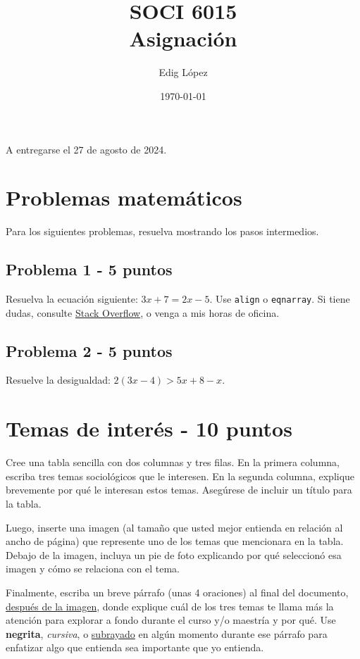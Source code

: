 \documentclass[11pt]{article} %
\title{SOCI 6015\\ Asignación \textnumero 1}
\author{Edig López}
\date{\today}
\begin{document}
\maketitle
\begin{center}
   A entregarse el 27 de agosto de 2024. 
\end{center}


\section{Problemas matemáticos}

Para los siguientes problemas, resuelva mostrando los pasos intermedios.

\subsection{Problema 1 - 5 puntos} 

Resuelva la ecuación siguiente: $3x + 7 = 2x - 5$. Use \texttt{align} o \texttt{eqnarray}. Si tiene dudas, consulte \href{https://tex.stackexchange.com}{Stack Overflow}, o venga a mis horas de oficina.

\subsection{Problema 2 - 5 puntos} 

Resuelve la desigualdad: $2(3x - 4) > 5x + 8 - x$. 

\section{Temas de interés - 10 puntos}

Cree una tabla sencilla con dos columnas y tres filas. En la primera columna, escriba tres temas sociológicos que le interesen. En la segunda columna, explique brevemente por qué le interesan estos temas. Asegúrese de incluir un título para la tabla. 

Luego, inserte una imagen (al tamaño que usted mejor entienda en relación al ancho de página) que represente uno de los temas que mencionara en la tabla. Debajo de la imagen, incluya un pie de foto explicando por qué seleccionó esa imagen y cómo se relaciona con el tema. 

Finalmente, escriba un breve párrafo (unas 4 oraciones) al final del documento, \underline{después de la imagen}, donde explique cuál de los tres temas te llama más la atención para explorar a fondo durante el curso y/o maestría y por qué. Use \textbf{negrita}, \textit{cursiva}, o \underline{subrayado} en algún momento durante ese párrafo para enfatizar algo que entienda sea importante que yo entienda.
\end{document}
